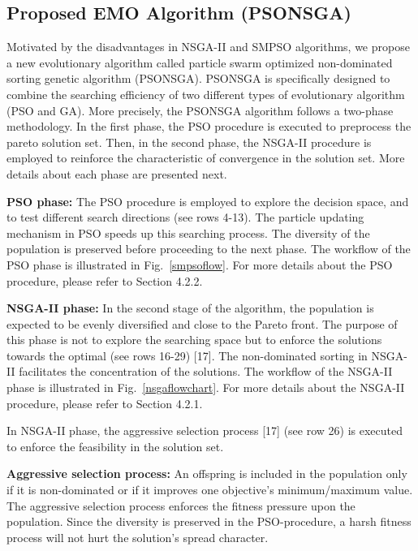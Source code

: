\documentclass[10pt,journal,compsoc]{IEEEtran}
\newcommand{\Fig}[1]{Fig.~\ref{#1}}
\begin{document}
\subsection{Proposed EMO Algorithm (PSONSGA)}
Motivated by the disadvantages in NSGA-II and SMPSO algorithms, we propose a new evolutionary algorithm called particle swarm optimized non-dominated sorting genetic algorithm (PSONSGA). PSONSGA is specifically designed to combine the searching efficiency of two different types of evolutionary algorithm (PSO and GA). More precisely, the PSONSGA algorithm follows a two-phase methodology. In the first phase, the PSO procedure is executed to preprocess the pareto solution set. Then, in the second phase, the NSGA-II procedure is employed to reinforce the characteristic of convergence in the solution set. More details about each phase are presented next.


\noindent\textbf{PSO phase:}
The PSO procedure is employed to explore the decision space, and to test different search directions (see rows 4-13). The particle updating mechanism in PSO speeds up this searching process. The diversity of the population is preserved before proceeding to the next phase. The workflow of the PSO phase is illustrated in \Fig{smpsoflow}. For more details about the PSO procedure, please refer to Section 4.2.2. 

\noindent\textbf{NSGA-II phase:}
In the second stage of the algorithm, the population is expected to be evenly diversified and close to the Pareto front. The purpose of this phase is not to explore the searching space but to enforce the solutions towards the optimal (see rows 16-29) [17]. The non-dominated sorting in NSGA-II facilitates the concentration of the solutions. The workflow of the NSGA-II phase is illustrated in \Fig{nsgaflowchart}. For more details about the NSGA-II procedure, please refer to Section 4.2.1. 

In NSGA-II phase, the aggressive selection process [17] (see row 26) is executed to enforce the feasibility in the solution set. 

\noindent\textbf{Aggressive selection process: }
An offspring is included in the population only if it is non-dominated or if it improves one objective’s minimum/maximum value. The aggressive selection process enforces the fitness pressure upon the population. Since the diversity is preserved in the PSO-procedure, a harsh fitness process will not hurt the solution’s spread character. 
\end{document}
